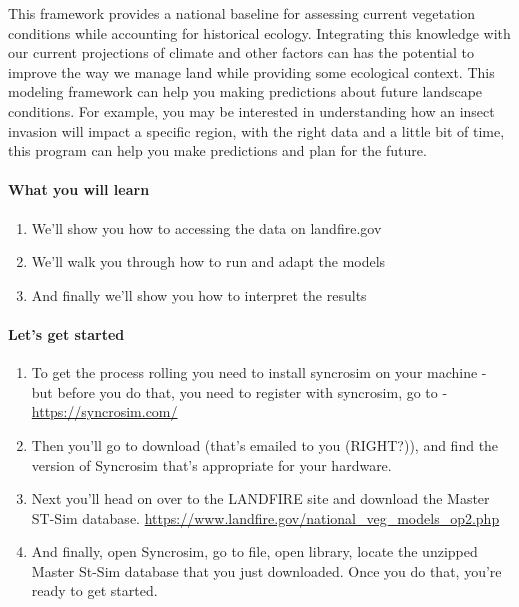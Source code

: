 \documentclass[
]{article}
\providecommand{\tightlist}{%
  \setlength{\itemsep}{0pt}\setlength{\parskip}{0pt}}
\begin{document}
This framework provides a national baseline for assessing current
vegetation conditions while accounting for historical ecology.
Integrating this knowledge with our current projections of climate and
other factors can has the potential to improve the way we manage land
while providing some ecological context. This modeling framework can
help you making predictions about future landscape conditions. For
example, you may be interested in understanding how an insect invasion
will impact a specific region, with the right data and a little bit of
time, this program can help you make predictions and plan for the
future.

\hypertarget{what-you-will-learn}{%
\paragraph{What you will learn}\label{what-you-will-learn}}

\begin{enumerate}
\def\labelenumi{\arabic{enumi}.}
\tightlist
\item
  We'll show you how to accessing the data on landfire.gov
\item
  We'll walk you through how to run and adapt the models
\item
  And finally we'll show you how to interpret the results
\end{enumerate}

\hypertarget{lets-get-started}{%
\paragraph{Let's get started}\label{lets-get-started}}

\begin{enumerate}
\def\labelenumi{\arabic{enumi}.}
\item
  To get the process rolling you need to install syncrosim on your
  machine - but before you do that, you need to register with syncrosim,
  go to - \url{https://syncrosim.com/}
\item
  Then you'll go to download (that's emailed to you (RIGHT?)), and find
  the version of Syncrosim that's appropriate for your hardware.
\item
  Next you'll head on over to the LANDFIRE site and download the Master
  ST-Sim database.
  \url{https://www.landfire.gov/national_veg_models_op2.php}
\item
  And finally, open Syncrosim, go to file, open library, locate the
  unzipped Master St-Sim database that you just downloaded. Once you do
  that, you're ready to get started.
\end{enumerate}
\end{document}
